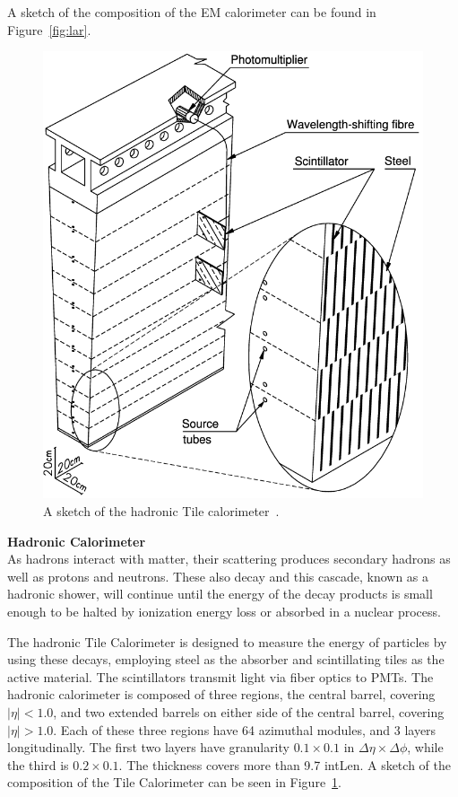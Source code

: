 A sketch of the composition of the \gls{EM} calorimeter can be found in Figure~\ref{fig:lar}.

\begin{figure}[!ht]
    \centering
    \includegraphics[width=.65\textwidth]{chapters/chapter2_experiment/images/tile.png}
    \caption[A sketch of the hadronic Tile calorimeter]{A sketch of the hadronic Tile calorimeter~\cite{tile-tdr}.}
    \label{fig:tile}
\end{figure}


\noindent\textbf{Hadronic Calorimeter}\\
\indent As hadrons interact with matter, their scattering produces secondary hadrons as well as protons and neutrons. These also decay and this cascade, known as a hadronic shower, will continue until the energy of the decay products is small enough to be halted by ionization energy loss or absorbed in a nuclear process.

\indent The hadronic Tile Calorimeter is designed to measure the energy of particles by using these decays, employing steel as the absorber and scintillating tiles as the active material. The scintillators transmit light via fiber optics to \glspl{PMT}. The hadronic calorimeter is composed of three regions, the central barrel, covering $|\eta| < 1.0$, and two extended barrels on either side of the central barrel, covering $|\eta| > 1.0$. Each of these three regions have 64 azimuthal modules, and 3 layers longitudinally. The first two layers have granularity $0.1 \times 0.1$ in $\Delta\eta \times \Delta \phi$, while the third is $0.2 \times 0.1$. The thickness covers more than 9.7 \gls{intLen}. A sketch of the composition of the Tile Calorimeter can be seen in Figure~\ref{fig:tile}.

